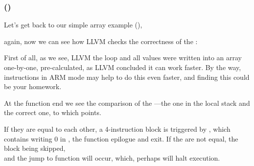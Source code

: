 \subsubsection{\OptimizingXcodeIV (\ThumbTwoMode)}

Let's get back to our simple array example (),

again, now we can see how LLVM checks the correctness of the :




First of all, as we see, LLVM  the loop and all values were written into an array one-by-one,
pre-calculated, as LLVM concluded it can work faster.
By the way, instructions in ARM mode may help to do this even faster, 
and finding this could be your homework.


At the function end we see the comparison of the ---the one in the local stack and the correct one,
to which  points.

If they are equal to each other, a 4-instruction block is triggered by ,
which contains writing 0 in , the function epilogue and exit.
If the  are not equal, the block being skipped,\\
and the jump to 
 function will occur, which, perhaps will halt execution.
